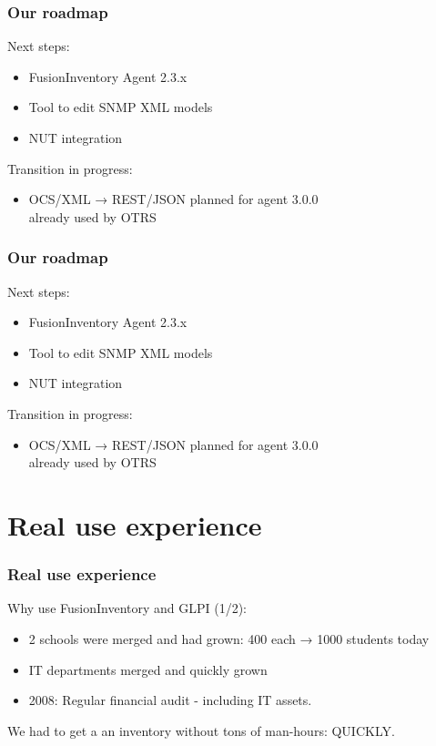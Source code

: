 \documentclass{beamer}
\begin{document}
\begin{frame}
    \frametitle{Our roadmap}

    Next steps:
    \begin{itemize}
        \item FusionInventory Agent 2.3.x
        \item Tool to edit SNMP XML models
        \item NUT integration
    \end{itemize}

    Transition in progress:
    \begin{itemize}
        \item OCS/XML → REST/JSON
        \small{planned for agent 3.0.0\\already used by OTRS}
    \end{itemize}

\end{frame}

\begin{frame}
    \frametitle{Our roadmap}

    Next steps:
    \begin{itemize}
        \item FusionInventory Agent 2.3.x
        \item Tool to edit SNMP XML models
        \item NUT integration
    \end{itemize}

    Transition in progress:
    \begin{itemize}
        \item OCS/XML → REST/JSON
        \small{planned for agent 3.0.0\\already used by OTRS}
    \end{itemize}

\end{frame}


\section{Real use experience}

\begin{frame}
    \frametitle{Real use experience}

    Why use FusionInventory and GLPI (1/2):
    \begin{itemize}
	\item 2 schools were merged and had grown: 400 each →  1000 students today
	\item IT departments merged and quickly grown
	\item 2008: Regular financial audit - including IT assets.
    \end{itemize}

    We had to get a an inventory without tons of man-hours: QUICKLY.
 
\end{frame}
\end{document}
